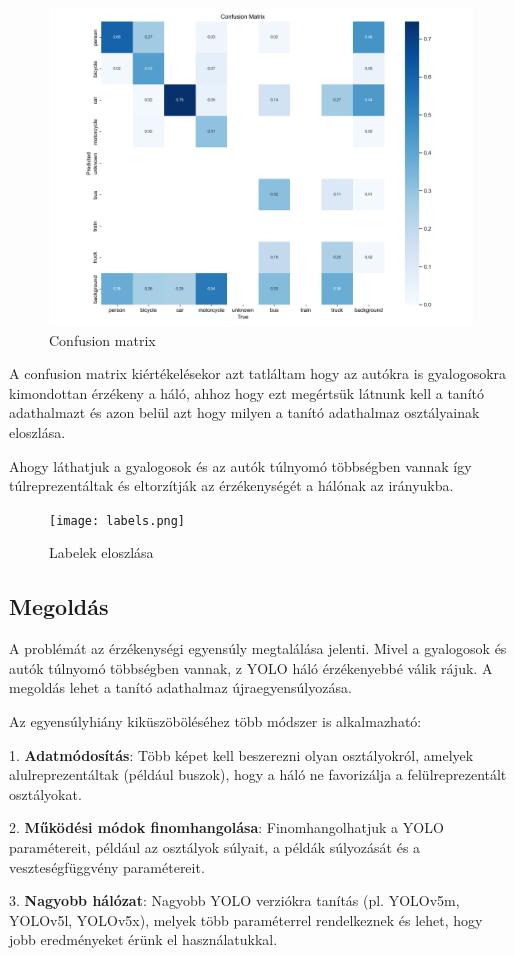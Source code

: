 \documentclass{article}
\begin{document}
\begin{figure} [ht]
    \centering
    \includegraphics[width=1\linewidth]{confusion_matrix.png}
    \caption{Confusion matrix}
    \label{fig:confusion}
\end{figure}
\newpage
A confusion matrix kiértékelésekor azt tatláltam hogy az autókra is gyalogosokra kimondottan érzékeny a háló, ahhoz hogy ezt megértsük látnunk kell a tanító adathalmazt és azon belül azt hogy milyen a tanító adathalmaz osztályainak eloszlása. 
\par
Ahogy láthatjuk a gyalogosok és az autók túlnyomó többségben vannak így túlreprezentáltak és eltorzítják az érzékenységét a hálónak az irányukba.


\begin{figure}[hb!]
    \centering
    \texttt{[image: labels.png]}
    \caption{Labelek eloszlása}
    \label{fig:labels}
\end{figure}
\subsection{Megoldás}
A problémát az érzékenységi egyensúly megtalálása jelenti. Mivel a gyalogosok és autók túlnyomó többségben vannak, z YOLO háló érzékenyebbé válik rájuk. A megoldás lehet a tanító adathalmaz újraegyensúlyozása.

Az egyensúlyhiány kiküszöböléséhez több módszer is alkalmazható:

1. \textbf{Adatmódosítás}: Több képet kell beszerezni olyan osztályokról, amelyek alulreprezentáltak (például buszok), hogy a háló ne favorizálja a felülreprezentált osztályokat.

2. \textbf{Működési módok finomhangolása}: Finomhangolhatjuk a YOLO paramétereit, például az osztályok súlyait, a példák súlyozását és a veszteségfüggvény paramétereit.

3. \textbf{Nagyobb hálózat}: Nagyobb YOLO verziókra tanítás (pl. YOLOv5m, YOLOv5l, YOLOv5x), melyek több paraméterrel rendelkeznek és lehet, hogy jobb eredményeket érünk el használatukkal.


\listoffigures
\end{document}
